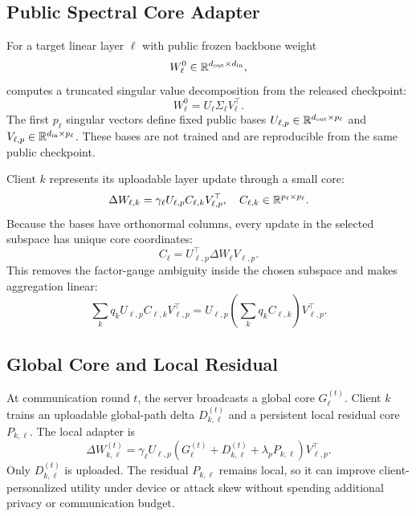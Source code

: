 \subsection{Public Spectral Core Adapter}
\label{sec:public_spectral_core}
For a target linear layer $\ell$ with public frozen backbone weight
\begin{equation}
  W_{\ell}^{0} \in \mathbb{R}^{d_{\mathrm{out}}\times d_{\mathrm{in}}},
\end{equation}
\method computes a truncated singular value decomposition from the released checkpoint:
\begin{equation}
  W_{\ell}^{0} = U_{\ell}\Sigma_{\ell}V_{\ell}^{\top}.
\end{equation}
The first $p_{\ell}$ singular vectors define fixed public bases $U_{\ell,p}\in\mathbb{R}^{d_{\mathrm{out}}\times p_{\ell}}$ and $V_{\ell,p}\in\mathbb{R}^{d_{\mathrm{in}}\times p_{\ell}}$. These bases are not trained and are reproducible from the same public checkpoint.

Client $k$ represents its uploadable layer update through a small core:
\begin{equation}
  \Delta W_{\ell,k} =
  \gamma_{\ell} U_{\ell,p} C_{\ell,k} V_{\ell,p}^{\top},
  \quad C_{\ell,k}\in\mathbb{R}^{p_{\ell}\times p_{\ell}}.
  \label{eq:core_update}
\end{equation}
Because the bases have orthonormal columns, every update in the selected subspace has unique core coordinates:
\begin{equation}
  C_{\ell} = U_{\ell,p}^{\top}\Delta W_{\ell}V_{\ell,p}.
\end{equation}
This removes the factor-gauge ambiguity inside the chosen subspace and makes aggregation linear:
\begin{equation}
  \sum_k q_k U_{\ell,p}C_{\ell,k}V_{\ell,p}^{\top}
  =
  U_{\ell,p}\left(\sum_k q_k C_{\ell,k}\right)V_{\ell,p}^{\top}.
\end{equation}

\subsection{Global Core and Local Residual}
At communication round $t$, the server broadcasts a global core $G_{\ell}^{(t)}$. Client $k$ trains an uploadable global-path delta $D_{k,\ell}^{(t)}$ and a persistent local residual core $P_{k,\ell}$. The local adapter is
\begin{equation}
  \Delta W_{k,\ell}^{(t)}
  =
  \gamma_{\ell}U_{\ell,p}
  \left(G_{\ell}^{(t)} + D_{k,\ell}^{(t)}
  + \lambda_p P_{k,\ell}\right)
  V_{\ell,p}^{\top}.
  \label{eq:local_residual}
\end{equation}
Only $D_{k,\ell}^{(t)}$ is uploaded. The residual $P_{k,\ell}$ remains local, so it can improve client-personalized utility under device or attack skew without spending additional privacy or communication budget.

